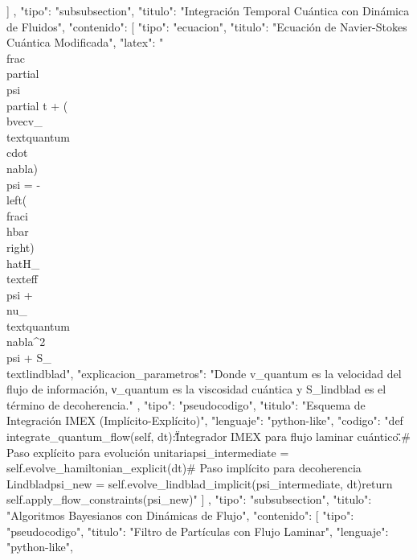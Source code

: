 \documentclass{article}
\begin{document}
{{{{{                }
              ]
            },
            {
              "tipo": "subsubsection",
              "titulo": "Integración Temporal Cuántica con Dinámica de Fluidos",
              "contenido": [
                {
                  "tipo": "ecuacion",
                  "titulo": "Ecuación de Navier-Stokes Cuántica Modificada",
                  "latex": "\\frac{\\partial\\psi}{\\partial t} + (\\bvec{v}_{\\text{quantum}} \\cdot \\nabla)\\psi = -\n    \\left(\\frac{i}{\\hbar}\\right)\\hat{H}_{\\text{eff}} \\psi + \\nu_{\\text{quantum}} \\nabla^2\\psi + S_{\\text{lindblad}}",
                  "explicacion_parametros": "Donde v_quantum es la velocidad del flujo de información, ν_quantum es la viscosidad cuántica y S_lindblad es el término de decoherencia."
                },
                {
                  "tipo": "pseudocodigo",
                  "titulo": "Esquema de Integración IMEX (Implícito-Explícito)",
                  "lenguaje": "python-like",
                  "codigo": "def integrate_quantum_flow(self, dt):\n    \"\"\"Integrador IMEX para flujo laminar cuántico.\"\"\"\n    # Paso explícito para evolución unitaria\n    psi_intermediate = self.evolve_hamiltonian_explicit(dt)\n    # Paso implícito para decoherencia Lindblad\n    psi_new = self.evolve_lindblad_implicit(psi_intermediate, dt)\n    return self.apply_flow_constraints(psi_new)"
                }
              ]
            },
            {
              "tipo": "subsubsection",
              "titulo": "Algoritmos Bayesianos con Dinámicas de Flujo",
              "contenido": [
                {
                  "tipo": "pseudocodigo",
                  "titulo": "Filtro de Partículas con Flujo Laminar",
                  "lenguaje": "python-like",
}}}}}
\end{document}
